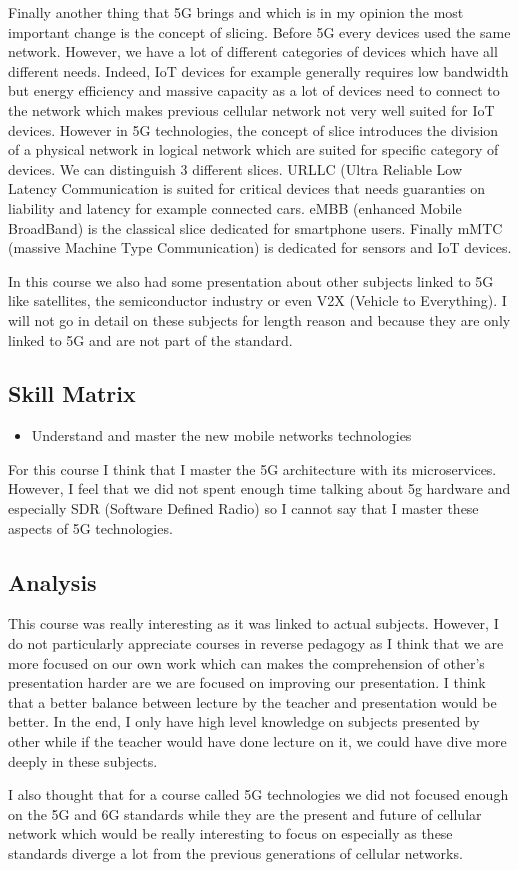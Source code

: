 Finally another thing that 5G brings and which is in my opinion the most important change is the concept of slicing. Before 5G every devices used the same network. However, we have a lot of different categories of devices which have all different needs. Indeed, IoT devices for example generally requires low bandwidth but energy efficiency and massive capacity as a lot of devices need to connect to the network which makes previous cellular network not very well suited for IoT devices. However in 5G technologies, the concept of slice introduces the division of a physical network in logical network which are suited for specific category of devices. We can distinguish 3 different slices. URLLC (Ultra Reliable Low Latency Communication is suited for critical devices that needs guaranties on liability and latency for example connected cars. eMBB (enhanced Mobile BroadBand) is the classical slice dedicated for smartphone users. Finally mMTC (massive Machine Type Communication) is dedicated for sensors and IoT devices.
\smallskip

In this course we also had some presentation about other subjects linked to 5G like satellites, the semiconductor industry or even V2X (Vehicle to Everything). I will not go in detail on these subjects for length reason and because they are only linked to 5G and are not part of the standard. 

\subsection{Skill Matrix}

\begin{itemize}
    \item Understand and master the new mobile networks technologies
\end{itemize}

For this course I think that I master the 5G architecture with its microservices. However, I feel that we did not spent enough time talking about 5g hardware and especially SDR (Software Defined Radio) so I cannot say that I master these aspects of 5G technologies.

\subsection{Analysis} \label{Analysis_5G}

This course was really interesting as it was linked to actual subjects. However, I do not particularly appreciate courses in reverse pedagogy as I think that we are more focused on our own work which can makes the comprehension of other's presentation harder are we are focused on improving our presentation. I think that a better balance between lecture by the teacher and presentation would be better. In the end, I  only have high level knowledge on subjects presented by other while if the teacher would have done lecture on it, we could have dive more deeply in these subjects.
\smallskip

I also thought that for a course called 5G technologies we did not focused enough on the 5G and 6G standards while they are the present and future of cellular network which would be really interesting to focus on especially as these standards diverge a lot from the previous generations of cellular networks.